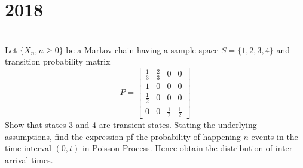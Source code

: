 \section*{2018}
\vspace{-.5cm}
\hrulefill \smallskip\\
 Let $\{X_n,n\geq0\}$ be a Markov chain having a sample space $S=\{1,2,3,4\}$ and transition probability matrix
\[ P = \begin{bmatrix} \frac{1}{3} & \frac{2}{3} & 0 & 0 \\
                    1 & 0 & 0 & 0\\
                   \frac{1}{2} & 0 & 0 & 0 \\
                   0 & 0 & \frac{1}{2} &\frac{1}{2} \end{bmatrix} \]
Show that states 3 and 4 are transient states.
\myline
{} Stating the underlying assumptions, find the expression pf the probability of happening $n$ events in the time interval $(0,t)$ in Poisson Process. Hence obtain the distribution of inter-arrival times.